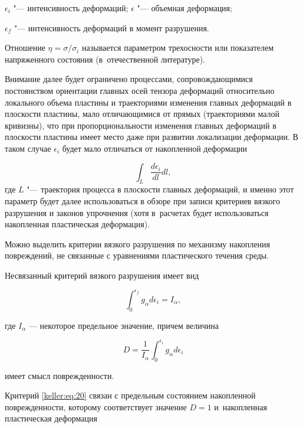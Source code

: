 $\epsilon_i$ "--- интенсивность деформаций; $\epsilon$ "--- объемная деформация; 

$\epsilon_f$ "--- интенсивность деформаций в момент разрушения. 



Отношение $\eta=\sigma/\sigma_i$ называется параметром трехосности или показателем напряженного состояния (в~отечественной литературе). 

Внимание далее будет ограничено  процессами, сопровождающимися постоянством ориентации главных осей тензора деформаций относительно локального объема пластины и траекториями изменения главных деформаций в плоскости пластины, мало отличающимися от прямых (траекториями малой кривизны), что при пропорциональности изменения главных деформаций в плоскости пластины имеет место даже при развитии локализации деформации. В таком случае $\epsilon_i$ будет мало отличаться от накопленной деформации 

$$\int_L \frac{d\epsilon_i}{dl}dl,$$ где $L$ "--- траектория процесса в плоскости главных деформаций, и именно этот параметр будет далее использоваться в обзоре при записи критериев вязкого разрушения и законов упрочнения (хотя в~расчетах будет использоваться накопленная пластическая деформация).



Можно выделить критерии вязкого разрушения по механизму накопления повреждений, не связанные с уравнениями пластического течения среды. 



Несвязанный критерий вязкого разрушения имеет вид 

\begin{equation}

	\int_0^{\epsilon_f}g_{\alpha} d\epsilon_i=I_{\alpha},

\end{equation}\label{keller:eq:20}

где $I_{\alpha}$ --- некоторое предельное значение, причем величина

\begin{equation}

	D=\frac{1}{I_{\alpha}}\int_0^{\epsilon_i}g_{\alpha} d\epsilon_i

\end{equation}

имеет смысл поврежденности. 

Критерий \eqref{keller:eq:20} связан с предельным состоянием накопленной поврежденности, которому соответствует значение $D=1$ и~накопленная пластическая деформация 

